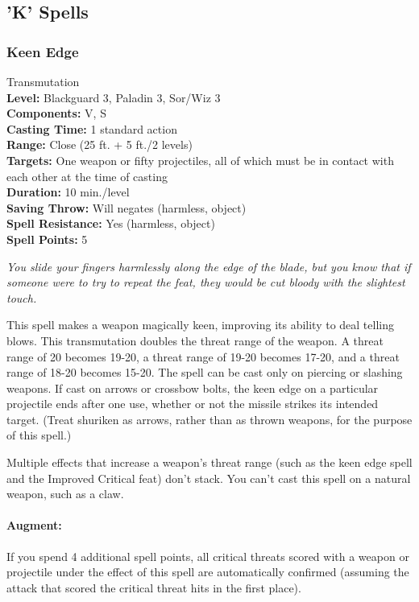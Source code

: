 \subsection{'K' Spells}
\subsubsection{Keen Edge}
\label{Spell:KeenEdge}
Transmutation
\\ \textbf{Level:} Blackguard 3, Paladin 3, Sor/Wiz 3
\\ \textbf{Components:} V, S
\\ \textbf{Casting Time:} 1 standard action
\\ \textbf{Range:} Close (25 ft. + 5 ft./2 levels)
\\ \textbf{Targets:} One weapon or fifty projectiles, all of which must be in contact with each other at the time of casting
\\ \textbf{Duration:} 10 min./level
\\ \textbf{Saving Throw:} Will negates (harmless, object)
\\ \textbf{Spell Resistance:} Yes (harmless, object)
\\ \textbf{Spell Points:} 5

\emph{You slide your fingers harmlessly along the edge of the blade, but you know that if someone were to try to repeat the feat, they would be cut bloody with the slightest touch.}

This spell makes a weapon magically keen, improving its ability to deal telling blows. 
This transmutation doubles the threat range of the weapon. 
A threat range of 20 becomes 19-20, a threat range of 19-20 becomes 17-20, and a threat range of 18-20 becomes 15-20. 
The spell can be cast only on piercing or slashing weapons. 
If cast on arrows or crossbow bolts, the keen edge on a particular projectile ends after one use, 
whether or not the missile strikes its intended target. 
(Treat shuriken as arrows, rather than as thrown weapons, for the purpose of this spell.)

Multiple effects that increase a weapon's threat range (such as the keen edge spell and the Improved Critical feat) 
don't stack. You can't cast this spell on a natural weapon, such as a claw.

\paragraph{Augment:} If you spend 4 additional spell points, all critical threats scored with a weapon or projectile under 
the effect of this spell are automatically confirmed 
(assuming the attack that scored the critical threat hits in the first place).
